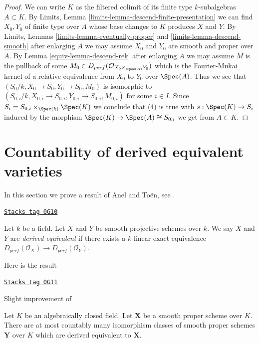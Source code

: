 \begin{proof}
\medskip\noindent
We can write $K$ as the filtered colimit of its finite type
$k$-subalgebras $A \subset K$. By
Limits, Lemma \ref{limits-lemma-descend-finite-presentation}
we can find $X_0, Y_0$ of finite type over $A$ whose
base changes to $K$ produces $X$ and $Y$.
By Limits, Lemmas
\ref{limits-lemma-eventually-proper} and \ref{limits-lemma-descend-smooth}
after enlarging $A$ we may assume $X_0$ and $Y_0$
are smooth and proper over $A$.
By Lemma \ref{equiv-lemma-descend-rek}
after enlarging $A$ we may assume $M$ is the pullback of
some $M_0  \in D_{perf}(\mathcal{O}_{X_0 \times_{\Spec(A)} Y_0})$
which is the Fourier-Mukai kernel of a relative equivalence
from $X_0$ to $Y_0$ over $\Spec(A)$.
Thus we see that $(S_0/k, X_0 \to S_0, Y_0 \to S_0, M_0)$
is isomorphic to
$(S_{0, i}/k, X_{0, i} \to S_{0, i}, Y_{0, i} \to S_{0, i}, M_{0, i})$
for some $i \in I$.
Since $S_i = S_{0, i} \times_{\Spec(k)} \Spec(K)$
we conclude that (4) is true with $s : \Spec(K) \to S_i$
induced by the morphism $\Spec(K) \to \Spec(A) \cong S_{0, i}$
we get from $A \subset K$.
\end{proof}

\section{Countability of derived equivalent varieties}
\label{equiv-section-countable-derived-equivalent}
In this section we prove a result of Anel and To\"en, see \cite{AT}.

\begin{definition}
\label{equiv-definition-derived-equivalent}
\href{https://stacks.math.columbia.edu/tag/0G10}{\texttt{Stacks tag 0G10}}

Let $k$ be a field. Let $X$ and $Y$ be smooth projective schemes over $k$.
We say $X$ and $Y$ are {\it derived equivalent} if there exists a $k$-linear
exact equivalence
$D_{perf}(\mathcal{O}_X) \to D_{perf}(\mathcal{O}_Y)$.
\end{definition}

Here is the result

\begin{theorem}[Countable]
\label{equiv-theorem-countable}
\href{https://stacks.math.columbia.edu/tag/0G11}{\texttt{Stacks tag 0G11}}

\begin{reference}
Slight improvement of \cite{AT}
\end{reference}
Let $K$ be an algebraically closed field. Let $\mathbf{X}$ be a smooth proper
scheme over $K$. There are at most countably many isomorphism classes
of smooth proper schemes $\mathbf{Y}$ over $K$ which are derived
equivalent to $\mathbf{X}$.
\end{theorem}

